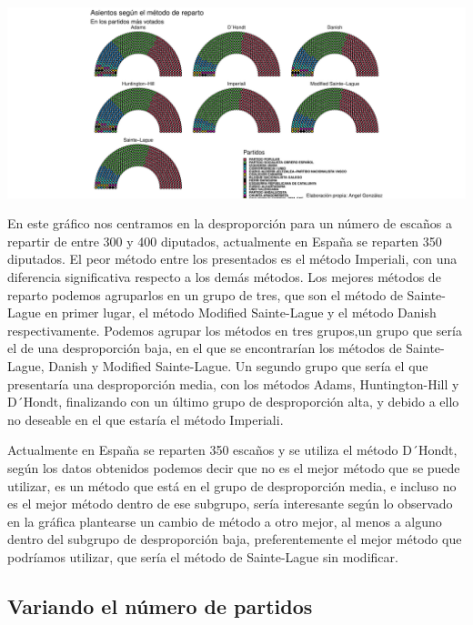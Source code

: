 \documentclass[12pt,a4paper,]{book}
\numberwithin{dummy}{section}
\theoremstyle{ocrenumbox}
\theoremstyle{blacknumex}
\theoremstyle{blacknumbox}
\theoremstyle{ocrenum}
\theoremstyle{ocrenum}
\begin{document}
\begin{center}\includegraphics[width=0.95\linewidth]{figurasR/unnamed-chunk-65-1} \end{center}

En este gráfico nos centramos en la desproporción para un número de
escaños a repartir de entre 300 y 400 diputados, actualmente en España
se reparten 350 diputados. El peor método entre los presentados es el
método Imperiali, con una diferencia significativa respecto a los demás
métodos. Los mejores métodos de reparto podemos agruparlos en un grupo
de tres, que son el método de Sainte-Lague en primer lugar, el método
Modified Sainte-Lague y el método Danish respectivamente. Podemos
agrupar los métodos en tres grupos,un grupo que sería el de una
desproporción baja, en el que se encontrarían los métodos de
Sainte-Lague, Danish y Modified Sainte-Lague. Un segundo grupo que sería
el que presentaría una desproporción media, con los métodos Adams,
Huntington-Hill y D´Hondt, finalizando con un último grupo de
desproporción alta, y debido a ello no deseable en el que estaría el
método Imperiali.

Actualmente en España se reparten 350 escaños y se utiliza el método
D´Hondt, según los datos obtenidos podemos decir que no es el mejor
método que se puede utilizar, es un método que está en el grupo de
desproporción media, e incluso no es el mejor método dentro de ese
subgrupo, sería interesante según lo observado en la gráfica plantearse
un cambio de método a otro mejor, al menos a alguno dentro del subgrupo
de desproporción baja, preferentemente el mejor método que podríamos
utilizar, que sería el método de Sainte-Lague sin modificar.

\hypertarget{variando-el-nuxfamero-de-partidos}{%
\subsection{Variando el número de
partidos}\label{variando-el-nuxfamero-de-partidos}}
\end{document}
